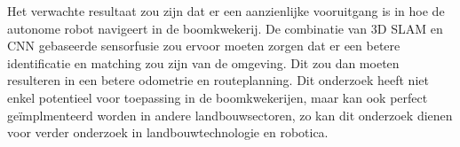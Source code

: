
Het verwachte resultaat zou zijn dat er een aanzienlijke vooruitgang is in hoe de autonome robot navigeert in de boomkwekerij.
De combinatie van 3D SLAM en CNN gebaseerde sensorfusie zou ervoor moeten zorgen dat er een betere identificatie en matching zou zijn van de omgeving.
Dit zou dan moeten resulteren in een betere odometrie en routeplanning.
Dit onderzoek heeft niet enkel potentieel voor toepassing in de boomkwekerijen, maar kan ook perfect geïmplmenteerd worden in andere landbouwsectoren, zo kan dit onderzoek dienen voor verder onderzoek in landbouwtechnologie en robotica.


